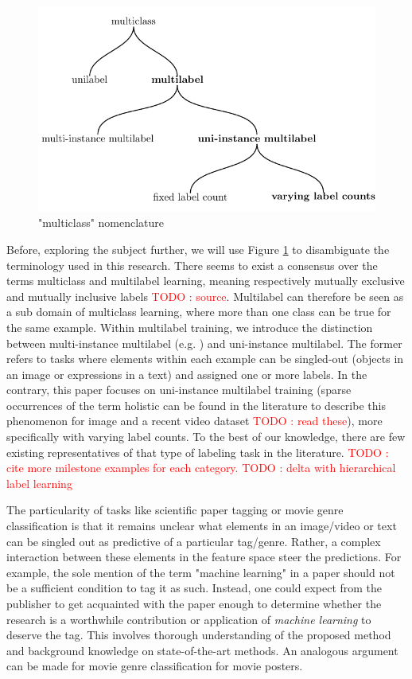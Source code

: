 \documentclass[sigconf,natbib,screen=true,review=true,anonymous]{acmart}
\newcommand\todo[1]{\textcolor{red}{TODO : #1}}
\begin{document}
\begin{figure}[htbp]
\centering
\includegraphics[width=.9\linewidth]{./tree/Tree.pdf}
\caption{\label{fig:tree}
"multiclass" nomenclature}
\end{figure}

Before, exploring the subject further, we will use Figure \ref{fig:tree} to disambiguate the terminology used in this research. There seems to exist a consensus over the terms multiclass and multilabel learning, meaning respectively mutually exclusive and mutually inclusive labels \todo{source}. Multilabel can therefore be seen as a sub domain of multiclass learning, where more than one class can be true for the same example. Within multilabel training, we introduce the distinction between multi-instance multilabel (e.g. \cite{multiInstance}) and uni-instance multilabel. The former refers to tasks where elements within each example can be singled-out (objects in an image or expressions in a text) and assigned one or more labels. In the contrary, this paper focuses on uni-instance multilabel training (sparse occurrences of the term holistic can be found in the literature to describe this phenomenon for image \cite{holisticImageDescriptors,holisticLungs} and a recent video dataset \cite{holisticVideoData} \todo{read these}), more specifically with varying label counts. To the best of our knowledge, there are few existing representatives of that type of labeling task in the literature. \todo{cite more milestone examples for each category.} \todo{delta with hierarchical label learning}

The particularity of tasks like scientific paper tagging or movie genre classification is that it remains unclear what elements in an image/video or text can be singled out as predictive of a particular tag/genre. Rather, a complex interaction between these elements in the feature space steer the predictions. For example, the sole mention of the term "machine learning" in a paper should not be a sufficient condition to tag it as such. Instead, one could expect from the publisher to get acquainted with the paper enough to determine whether the research is a worthwhile contribution or application of \emph{machine learning} to deserve the tag. This involves thorough understanding of the proposed method and background knowledge on state-of-the-art methods. An analogous argument can be made for movie genre classification for movie posters.
\end{document}
